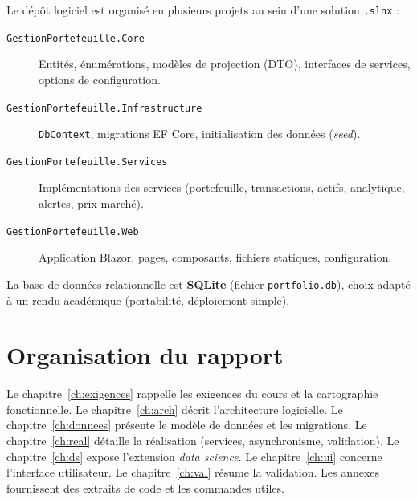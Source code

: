 Le dépôt logiciel est organisé en plusieurs projets au sein d'une solution \texttt{.slnx} :
\begin{description}
  \item[\texttt{GestionPortefeuille.Core}] Entités, énumérations, modèles de projection (DTO), interfaces de services, options de configuration.
  \item[\texttt{GestionPortefeuille.Infrastructure}] \texttt{DbContext}, migrations EF Core, initialisation des données (\emph{seed}).
  \item[\texttt{GestionPortefeuille.Services}] Implémentations des services (portefeuille, transactions, actifs, analytique, alertes, prix marché).
  \item[\texttt{GestionPortefeuille.Web}] Application Blazor, pages, composants, fichiers statiques, configuration.
\end{description}

La base de données relationnelle est \textbf{SQLite} (fichier \texttt{portfolio.db}), choix adapté à un rendu académique (portabilité, déploiement simple).

\section{Organisation du rapport}

Le chapitre~\ref{ch:exigences} rappelle les exigences du cours et la cartographie fonctionnelle. Le chapitre~\ref{ch:arch} décrit l'architecture logicielle. Le chapitre~\ref{ch:donnees} présente le modèle de données et les migrations. Le chapitre~\ref{ch:real} détaille la réalisation (services, asynchronisme, validation). Le chapitre~\ref{ch:ds} expose l'extension \emph{data science}. Le chapitre~\ref{ch:ui} concerne l'interface utilisateur. Le chapitre~\ref{ch:val} résume la validation. Les annexes fournissent des extraits de code et les commandes utiles.
